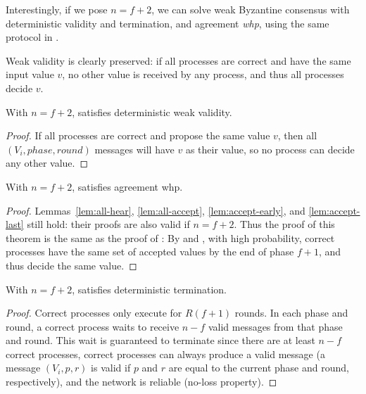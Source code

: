 Interestingly, if we pose $n=f+2$, we can solve weak Byzantine consensus with deterministic validity and termination, and agreement \textit{whp}, using the same protocol in .

Weak validity is clearly preserved: if all processes are correct and have the same input value $v$, no other value is received by any process, and thus all processes decide $v$.


\begin{theorem}
    With $n=f+2$,  satisfies deterministic weak validity.
\end{theorem}
\begin{proof}
    If all processes are correct and propose the same value $v$, then all $(V_i, phase, round)$ messages will have $v$ as their value, so no process can decide any other value.
\end{proof}

\begin{theorem}
    With $n=f+2$,  satisfies agreement whp.
\end{theorem}
\begin{proof}
    Lemmas~\ref{lem:all-hear}, \ref{lem:all-accept}, \ref{lem:accept-early}, and \ref{lem:accept-last} still hold: their proofs are also valid if $n=f+2$. Thus the proof of this theorem is the same as the proof of : By  and , with high probability, correct processes have the same set of accepted values by the end of phase $f+1$, and thus decide the same value.
\end{proof}

\begin{theorem}
    With $n=f+2$,  satisfies deterministic termination.
\end{theorem}
\begin{proof}
    Correct processes only execute for $R(f+1)$ rounds. In each phase and round, a correct process waits to receive $n-f$ valid messages from that phase and round. This wait is guaranteed to terminate since there are at least $n-f$ correct processes, correct processes can always produce a valid message (a message $(V_i, p, r)$ is valid if $p$ and $r$ are equal to the current phase and round, respectively), and the network is reliable (no-loss property).
\end{proof}